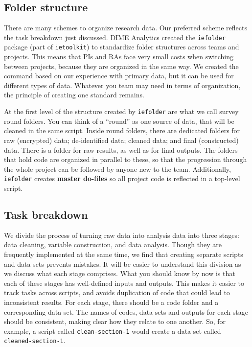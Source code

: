\subsection{Folder structure}
There are many schemes to organize research data. 
Our preferred scheme reflects the task breakdown just discussed.
DIME Analytics created the \texttt{iefolder}
package (part of \texttt{ietoolkit})
to standardize folder structures across teams and projects.
This means that PIs and RAs face very small costs when switching between projects, 
because they are organized in the same way.
We created the command based on our experience with primary data,
but it can be used for different types of data.
Whatever you team may need in terms of organization, 
the principle of creating one standard remains.

At the first level of the structure created by \texttt{iefolder} are what we call survey round folders.
You can think of a ``round'' as one source of data, 
that will be cleaned in the same script. 
Inside round folders, there are dedicated folders for 
raw (encrypted) data; de-identified data; cleaned data; and final (constructed) data. 
There is a folder for raw results, as well as for final outputs. 
The folders that hold code are organized in parallel to these, 
so that the progression through the whole project can be followed by anyone new to the team.  
Additionally, \texttt{iefolder} creates \textbf{master do-files} 
so all project code is reflected in a top-level script.

\subsection{Task breakdown}
We divide the process of turning raw data into analysis data into three stages: 
data cleaning, variable construction, and data analysis. 
Though they are frequently implemented at the same time, 
we find that creating separate scripts and data sets prevents mistakes. 
It will be easier to understand this division as we discuss what each stage comprises. 
What you should know by now is that each of these stages has well-defined inputs and outputs. 
This makes it easier to track tasks across scripts, 
and avoids duplication of code that could lead to inconsistent results. 
For each stage, there should be a code folder and a corresponding data set. 
The names of codes, data sets and outputs for each stage should be consistent,
making clear how they relate to one another. 
So, for example, a script called \texttt{clean-section-1} would create
a data set called \texttt{cleaned-section-1}.

